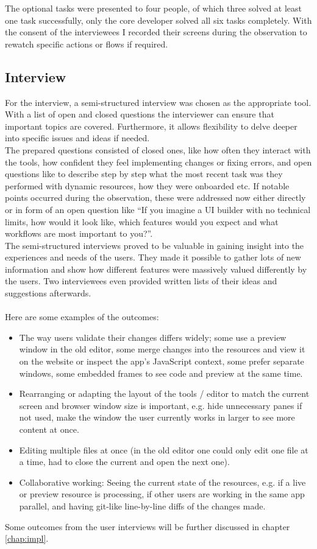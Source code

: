 The optional tasks were presented to four people, of which three solved at least one task successfully, only the core developer solved all six tasks completely.
With the consent of the interviewees I recorded their screens during the observation to rewatch specific actions or flows if required.

\subsection{Interview}
\label{subsec:interview}
For the interview, a semi-structured interview was chosen as the appropriate tool.
With a list of open and closed questions the interviewer can ensure that important topics are covered.
Furthermore, it allows flexibility to delve deeper into specific issues and ideas if needed.
\\
The prepared questions consisted of closed ones, like how often they interact with the tools, how confident they feel implementing changes or fixing errors, and open questions like to describe step by step what the most recent task was they performed with dynamic resources, how they were onboarded etc.
If notable points occurred during the observation, these were addressed now either directly or in form of an open question like ``If you imagine a UI builder with no technical limits, how would it look like, which features would you expect and what workflows are most important to you?''.
\\
The semi-structured interviews proved to be valuable in gaining insight into the experiences and needs of the users. They made it possible to gather lots of new information and show how different features were massively valued differently by the users. Two interviewees even provided written lists of their ideas and suggestions afterwards.
\\\\
Here are some examples of the outcomes:
\begin{itemize}[itemsep=0mm]
  \item The way users validate their changes differs widely; some use a preview window in the old editor, some merge changes into the resources and view it on the website or inspect the app's JavaScript context, some prefer separate windows, some embedded frames to see code and preview at the same time.
  \item Rearranging or adapting the layout of the tools / editor to match the current screen and browser window size is important, e.g. hide unnecessary panes if not used, make the window the user currently works in larger to see more content at once.
  \item Editing multiple files at once (in the old editor one could only edit one file at a time, had to close the current and open the next one).
  \item Collaborative working: Seeing the current state of the resources, e.g. if a live or preview resource is processing, if other users are working in the same app parallel, and having git-like line-by-line diffs of the changes made.
\end{itemize}
\bigskip
Some outcomes from the user interviews will be further discussed in chapter \ref*{chap:impl}.

